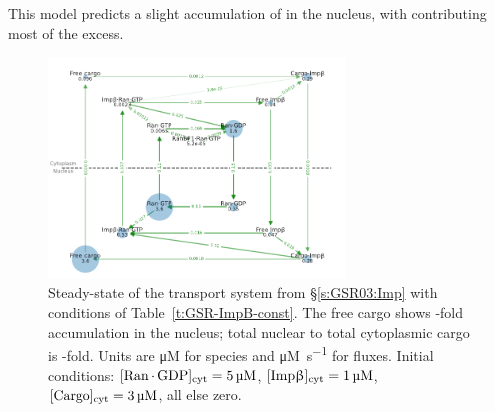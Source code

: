 \documentclass[12pt,notitlepage]{article}
\begin{document}
%

This model predicts a slight accumulation
of  in the nucleus,
with  contributing most of the excess.



\begin{figure}
\centering
\includegraphics[width=0.7\textwidth]{20210225-GSR/v2/python/graph/onion}
\caption{%
	Steady-state of 
	the transport system from 
	\S\ref{s:GSR03:Imp}
	with conditions 
	of Table~\ref{t:GSR-ImpB-const}.
	The free cargo
	shows 
	\protect\unskip%
	-fold accumulation
	in the nucleus;
	total nuclear to total cytoplasmic cargo
	is
	\protect\unskip%
	-fold.
	Units are \si{\micro M} for species
	and \si{\micro M . s^{-1}} for fluxes.
	Initial conditions:
	$[\ce{Ran . GDP}]_\text{cyt} = \SI{5}{\micro M}$,
	$[\ce{Imp\beta}]_\text{cyt} = \SI{1}{\micro M}$,
	$[\ce{Cargo}]_\text{cyt} = \SI{3}{\micro M}$,
	all else zero.
}
\label{f:GSR-v2}
\end{figure}
\end{document}
